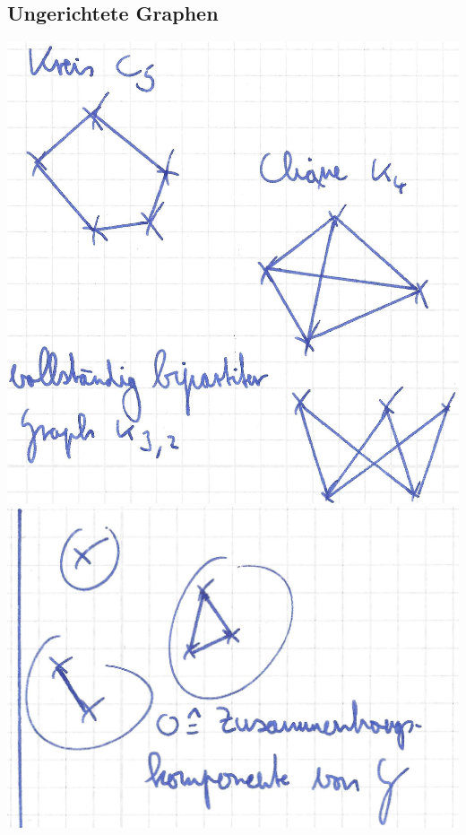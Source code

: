 \documentclass[10pt,a4paper]{article}
\begin{document}
\subsection{Ungerichtete Graphen}
\begin{center}
\includegraphics[scale=0.48]{typische_graphen.jpg} 
\includegraphics[scale=0.72]{zusammenhangskomponenten.jpg} 

\end{center}
\end{document}

